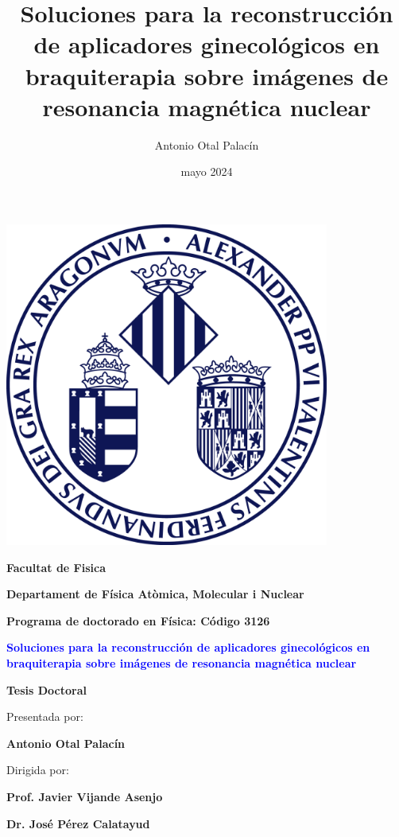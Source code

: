 \documentclass[
  a4paper,
]{scrreprt}
\title{Soluciones para la reconstrucción de aplicadores ginecológicos en
braquiterapia sobre imágenes de resonancia magnética nuclear}
\author{Antonio Otal Palacín}
\date{mayo 2024}
\begin{document}
\thispagestyle{empty}
\centering
\vspace*{-1cm} %
\includegraphics[width=0.8\textwidth]{logouni} %
\vfill
{\Large\bfseries Facultat de Fisica \par}
{\Large\bfseries Departament de Física Atòmica, Molecular i Nuclear \par}
{\Large\bfseries Programa de doctorado en Física: Código 3126 \par}
{\textcolor{blue}{\Huge\bfseries Soluciones para la reconstrucción de
aplicadores ginecológicos en braquiterapia sobre imágenes de resonancia
magnética nuclear} \par}
\vspace{3ex}
{\Large\bfseries Tesis Doctoral \par}
{\Large Presentada por: \par}
{\Large\bfseries Antonio Otal Palacín \par}
{\Large Dirigida por: \par}
\vspace{3ex}
%
\begin{minipage}[t]{0.4\textwidth}
    \centering
    {\Large\bfseries Prof. Javier Vijande Asenjo \par}
\end{minipage}
\hfill
\begin{minipage}[t]{0.4\textwidth}
    \centering
    {\Large\bfseries Dr. José Pérez Calatayud \par}
\end{minipage}
\end{document}
